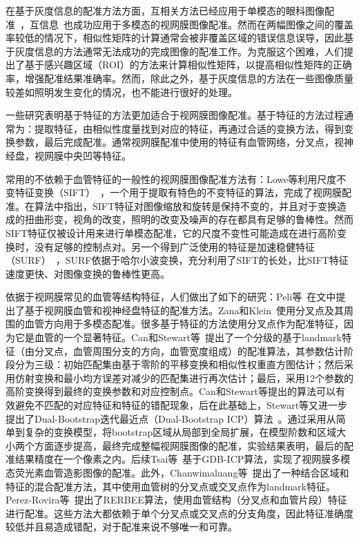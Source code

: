 在基于灰度信息的配准方法方面，互相关方法已经应用于单模态的眼科图像配准~\cite{cide}，互信息~\cite{skokan}也成功应用于多模态的视网膜图像配准。然而在两幅图像之间的覆盖率较低的情况下，相似性矩阵的计算通常会被非覆盖区域的错误信息误导，因此基于灰度信息的方法通常无法成功的完成图像的配准工作。为克服这个困难，人们提出了基于感兴趣区域（ROI）的方法来计算相似性矩阵，以提高相似性矩阵的正确率，增强配准结果准确率。然而，除此之外，基于灰度信息的方法在一些图像质量较差如照明发生变化的情况，也不能进行很好的处理。

一些研究表明基于特征的方法更加适合于视网膜图像配准。基于特征的方法过程通常为：提取特征，由相似性度量找到对应的特征，再通过合适的变换方法，得到变换参数，最后完成配准。通常视网膜配准中使用的特征有血管网络，分叉点，视神经盘，视网膜中央凹等特征。

常用的不依赖于血管特征的一般性的视网膜图像配准方法有：Lowe等利用尺度不变特征变换（SIFT）~\cite{lowe}，一个用于提取有特色的不变特征的算法，完成了视网膜配准。在算法中指出，SIFT特征对图像缩放和旋转是保持不变的，并且对于变换造成的扭曲形变，视角的改变，照明的改变及噪声的存在都具有足够的鲁棒性。然而SIFT特征仅被设计用来进行单模态配准，它的尺度不变性可能造成在进行高阶变换时，没有足够的控制点对。另一个得到广泛使用的特征是加速稳健特征（SURF）~\cite{bay}，SURF依据于哈尔小波变换，充分利用了SIFT的长处，比SIFT特征速度更快、对图像变换的鲁棒性更高。

依据于视网膜常见的血管等结构特征，人们做出了如下的研究：Peli等~\cite{peli}在文中提出了基于视网膜血管和视神经盘特征的配准方法。Zana和Klein~\cite{zana}使用分叉点及其周围的血管方向用于多模态配准。很多基于特征的方法使用分叉点作为配准特征，因为它是血管的一个显著特征。Can和Stewart等~\cite{can2002}提出了一个分级的基于landmark特征（由分叉点，血管周围分支的方向，血管宽度组成）的配准算法，其参数估计阶段分为三级：初始匹配集由基于零阶的平移变换和相似性权重直方图估计；然后采用仿射变换和最小均方误差对减少的匹配集进行再次估计；最后，采用12个参数的高阶变换得到最终的变换参数和对应控制点。Can和Stewart等提出的算法可以有效避免不匹配的对应特征和特征的错配现象，后在此基础上，Stewart等又进一步提出了Dual-Bootstrap迭代最近点（Dual-Bootstrap ICP）算法~\cite{stewart}。通过采用从简单到复杂的变换模型，将bootstrap区域从局部到全局扩展，在模型阶数和区域大小两个方面逐步提高，最终完成整幅视网膜图像的配准，实验结果表明，最后的配准结果精度在一个像素之内。后续Tsai等~\cite{tsai}基于GDB-ICP算法，实现了视网膜多模态荧光素血管造影图像的配准。此外，Chanwimaluang等~\cite{thi}提出了一种结合区域和特征的混合配准方法，其中使用血管树的分叉点或交叉点作为landmark特征。Perez-Rovira等~\cite{adria}提出了RERBEE算法，使用血管结构（分叉点和血管片段）特征进行配准。这些方法大都依赖于单个分叉点或交叉点的分支角度，因此特征准确度较低并且易造成错配，对于配准来说不够唯一和可靠。

